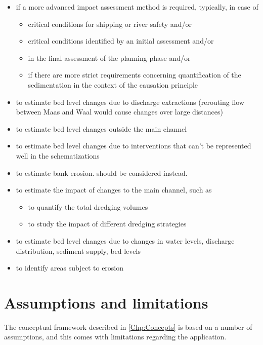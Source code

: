 \begin{itemize}
\item if a more advanced impact assessment method is required, typically, in case of
\begin{itemize}
\item critical conditions for shipping or river safety and/or
\item critical conditions identified by an initial \dfmi assessment and/or
\item in the final assessment of the planning phase and/or
\item if there are more strict requirements concerning quantification of the sedimentation in the context of the causation principle
\end{itemize}
\item to estimate bed level changes due to discharge extractions (rerouting flow between Maas and Waal would cause changes over large distances)
\item to estimate bed level changes outside the main channel
\item to estimate bed level changes due to interventions that can't be represented well in the \dflowfm schematizations
\item to estimate bank erosion. \dfastbe should be considered instead.
\item to estimate the impact of changes to the main channel, such as
\begin{itemize}
\item to quantify the total dredging volumes
\item to study the impact of different dredging strategies
\end{itemize}
\item to estimate bed level changes due to changes in water levels, discharge distribution, sediment supply, bed levels
\item to identify areas subject to erosion
\end{itemize}


\section{Assumptions and limitations}\label{Sec:Limitations}

The conceptual framework described in \autoref{Chp:Concepts} is based on a number of assumptions, and this comes with limitations regarding the application.

